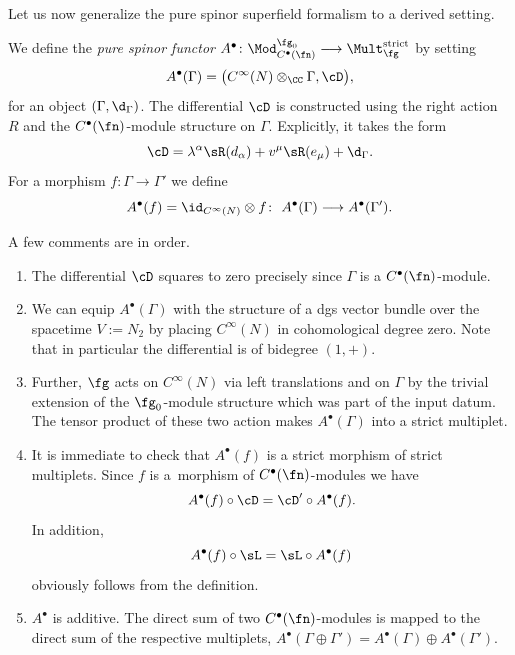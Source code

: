 Let us now generalize the pure spinor superfield formalism to a derived setting.
\begin{dfn}
	We define the \emph{pure spinor functor} $A^\bullet \colon \Mod_{C^\bullet(\fn)}^{\fg_0} \longrightarrow \Mult_{\fg}^{\mathrm{strict}}$ by setting
	\begin{equation*}
	A^\bullet(\Gamma) = \big(C^\infty(N) \otimes_\CC \Gamma , \cD\big) ,
	\end{equation*}
	for an object $(\Gamma , \d_\Gamma)$.
	The differential $\cD$ is constructed using the right action $R$ and the $C^\bullet(\fn)$-module structure on $\Gamma$. Explicitly, it takes the form
	\begin{equation*}
	\cD = \lambda^\alpha \sR(d_\alpha) + v^\mu \sR(e_\mu) + \d_\Gamma .
	\end{equation*}
	For a morphism $f\colon\Gamma \longrightarrow \Gamma'$ we define
	\begin{equation*}
	A^\bullet(f) = \id_{C^\infty(N)} \otimes f \colon \ A^\bullet(\Gamma) \longrightarrow A^\bullet(\Gamma') .
	\end{equation*}
\end{dfn}

A few comments are in order.

\begin{enumerate}\itemsep=0pt
	\item The differential $\cD$ squares to zero precisely since $\Gamma$ is a $C^\bullet(\fn)$-module.
	\item We can equip $A^\bullet(\Gamma)$ with the structure of a dgs vector bundle over the spacetime $V := N_2$ by placing $C^\infty(N)$ in cohomological degree zero. Note that in particular the differential is of bidegree $(1,+)$.
	
	\item Further, $\fg$ acts on $C^\infty(N)$ via left translations and on $\Gamma$ by the trivial extension of the $\fg_0$-module structure which was part of the input datum. The tensor product of these two action makes $A^\bullet(\Gamma)$ into a strict multiplet.
	\item It is immediate to check that $A^\bullet(f)$ is a strict morphism of strict multiplets. Since $f$ is a~morphism of $C^\bullet(\fn)$-modules we have
	\begin{equation*}
	A^\bullet(f) \circ \cD = \cD' \circ A^\bullet(f) .
	\end{equation*}
	In addition,
	\begin{equation*}
	A^\bullet(f) \circ \sL = \sL \circ A^\bullet(f)
	\end{equation*}
	obviously follows from the definition.
	\item $A^\bullet$ is additive. The direct sum of two $C^\bullet(\fn)$-modules is mapped to the direct sum of the respective multiplets, $A^\bullet(\Gamma \oplus \Gamma') = A^\bullet(\Gamma) \oplus A^\bullet(\Gamma')$.
\end{enumerate}

